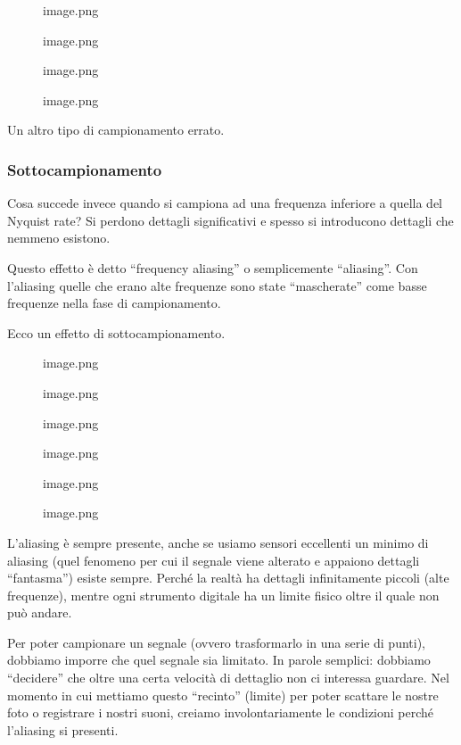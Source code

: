 \documentclass[
]{article}
\begin{document}
\begin{figure}
\centering
{image.png}
\caption{image.png}
\end{figure}

\begin{figure}
\centering
{image.png}
\caption{image.png}
\end{figure}

Un altro tipo di campionamento errato.

\hypertarget{sottocampionamento}{%
\subsubsection{Sottocampionamento}\label{sottocampionamento}}

Cosa succede invece quando si campiona ad una frequenza inferiore a quella del Nyquist rate?
Si perdono dettagli significativi e spesso si introducono dettagli che nemmeno esistono.

Questo effetto è detto ``frequency aliasing'' o semplicemente ``aliasing''.
Con l'aliasing quelle che erano alte frequenze sono state ``mascherate'' come basse frequenze nella fase di campionamento.

Ecco un effetto di sottocampionamento.

\begin{figure}
\centering
{image.png}
\caption{image.png}
\end{figure}

\begin{figure}
\centering
{image.png}
\caption{image.png}
\end{figure}

\begin{figure}
\centering
{image.png}
\caption{image.png}
\end{figure}

L'aliasing è sempre presente, anche se usiamo sensori eccellenti un minimo di aliasing (quel fenomeno per cui il segnale viene alterato e appaiono dettagli ``fantasma'') esiste sempre.
Perché la realtà ha dettagli infinitamente piccoli (alte frequenze), mentre ogni strumento digitale ha un limite fisico oltre il quale non può andare.

Per poter campionare un segnale (ovvero trasformarlo in una serie di punti), dobbiamo imporre che quel segnale sia limitato.
In parole semplici: dobbiamo ``decidere'' che oltre una certa velocità di dettaglio non ci interessa guardare. Nel momento in cui mettiamo questo ``recinto'' (limite) per poter scattare le nostre foto o registrare i nostri suoni, creiamo involontariamente le condizioni perché l'aliasing si presenti.
\end{document}
